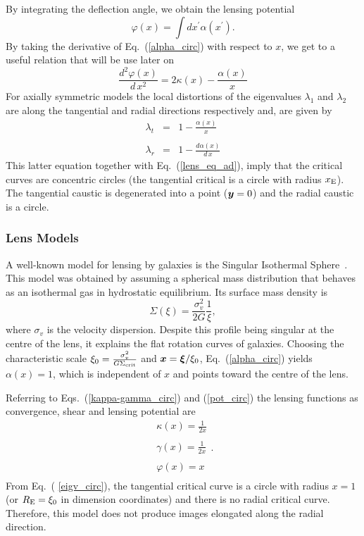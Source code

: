\documentclass[useAMS,usenatbib]{mn2e}
\begin{document}
By integrating the deflection angle, we obtain the lensing potential
\begin{equation}
\varphi(x)=\int d x^\prime \alpha(x^\prime) \label{pot_circ}.
\end{equation}
\noindent By taking the derivative of Eq.~(\ref{alpha_circ}) with respect to $x$, we get to a useful relation that will be use later on
\begin{equation}
\frac{d^2\varphi(x)}{d\,x^2}=2\kappa(x)-\frac{\alpha(x)}{x} \label{d2pot_circ}
\end{equation}
 For axially symmetric models the local distortions of the eigenvalues $\lambda_1$ and $\lambda_2$ are along the tangential and radial directions respectively and, are given by
\begin{eqnarray}
\lambda_t&=&1-\frac{\alpha(x)}{x} \nonumber \\
\label{eigv_circ} \\
\lambda_r&=&1-\frac{d\alpha(x)}{d\,x} \nonumber
\end{eqnarray}
This latter equation together with Eq.~(\ref{lens_eq_ad}), imply that the critical curves are concentric circles (the tangential critical is a circle with radius $x_{\rm E}$). The tangential caustic is degenerated into a point ($\bmath{y}=0$)  and the radial caustic is a circle.


\subsubsection{Lens Models}
A well-known model for lensing by galaxies is the Singular Isothermal Sphere~\citep[][hereafter SIS]{turner84,SEF}. This model was obtained by assuming a spherical mass distribution that behaves as an isothermal gas in hydrostatic equilibrium. Its surface mass density is
\[
\Sigma(\xi)=\frac{\sigma^2_v}{2G}\frac{1}{\xi},
\]
where $\sigma_v$ is the velocity dispersion. Despite this profile being singular at the centre of the lens, it explains the flat rotation curves of galaxies. Choosing the characteristic scale $\xi_0=\frac{\sigma^2_v}{G\Sigma_{\rm crit}}$ and $\bmath{x}=\bmath{\xi}/\xi_0$, Eq.~(\ref{alpha_circ}) yields $\alpha(x)=1$, which is independent of $x$ and points toward the centre of the lens.

Referring to Eqs.~(\ref{kappa-gamma_circ}) and (\ref{pot_circ}) the lensing functions as convergence, shear and lensing potential are
\begin{equation} 
\begin{array}{l}\label{sis_functs}
\kappa(x)=\frac{1}{2x}\\
\\
\gamma(x)=\frac{1}{2x} \\
\\
\varphi(x)= x\\
\end{array}.
\end{equation}
From Eq.~( \ref{eigv_circ}), the tangential critical curve is a circle with radius $x=1$ (or $R_{\rm E}=\xi_0$ in dimension coordinates) and there is no radial critical curve. Therefore, this model does not produce images elongated along the radial direction.
\end{document}
